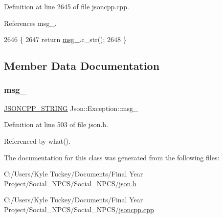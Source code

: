 Definition at line 2645 of file jsoncpp.\+cpp.



References msg\+\_\+.


\begin{DoxyCode}
2646 \{
2647   \textcolor{keywordflow}{return} \hyperlink{class_json_1_1_exception_aae3cbb8b45bf21480f64502a8329659f}{msg\_}.c\_str();
2648 \}
\end{DoxyCode}


\subsection{Member Data Documentation}
\mbox{\label{class_json_1_1_exception_aae3cbb8b45bf21480f64502a8329659f}} 
\subsubsection{\texorpdfstring{msg\+\_\+}{msg\_}}
{\footnotesize\ttfamily \hyperlink{json_8h_a1e723f95759de062585bc4a8fd3fa4be}{J\+S\+O\+N\+C\+P\+P\+\_\+\+S\+T\+R\+I\+NG} Json\+::\+Exception\+::msg\+\_\+\hspace{0.3cm}{\ttfamily [protected]}}



Definition at line 503 of file json.\+h.



Referenced by what().



The documentation for this class was generated from the following files\+:\begin{DoxyCompactItemize}
\item 
C\+:/\+Users/\+Kyle Tuckey/\+Documents/\+Final Year Project/\+Social\+\_\+\+N\+P\+C\+S/\+Social\+\_\+\+N\+P\+C\+S/\hyperlink{json_8h}{json.\+h}\item 
C\+:/\+Users/\+Kyle Tuckey/\+Documents/\+Final Year Project/\+Social\+\_\+\+N\+P\+C\+S/\+Social\+\_\+\+N\+P\+C\+S/\hyperlink{jsoncpp_8cpp}{jsoncpp.\+cpp}\end{DoxyCompactItemize}
